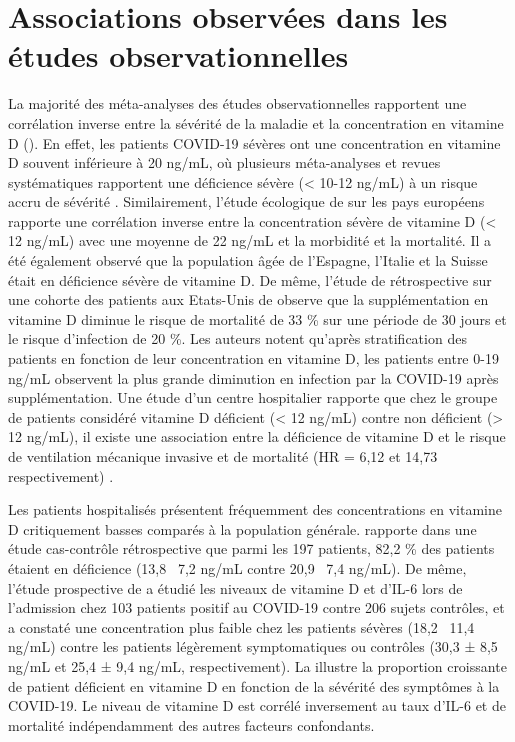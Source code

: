 \documentclass[
  a4paper,
  DIV=11,
  numbers=noendperiod,
  listof=totoc]{scrreprt}
\begin{document}
\section{Associations observées dans les études
observationnelles}\label{associations-observuxe9es-dans-les-uxe9tudes-observationnelles}

La majorité des méta-analyses des études observationnelles rapportent
une corrélation inverse entre la sévérité de la maladie et la
concentration en vitamine D (). En effet,
les patients COVID-19 sévères ont une concentration en vitamine D
souvent inférieure à 20 ng/mL, où plusieurs méta-analyses et revues
systématiques rapportent une déficience sévère (\textless{} 10-12 ng/mL)
à un risque accru de sévérité
\autocite{Contreras-Bolívar.2023, Borsche.2021,
Crafa.2021, DEcclesiis.2022, Pal.2022, Hariyanto.2022, Ghelani.2021}.
Similairement, l'étude écologique de \textcite{Ilie.2020} sur les pays
européens rapporte une corrélation inverse entre la concentration sévère
de vitamine D (\textless{} 12 ng/mL) avec une moyenne de 22 ng/mL et la
morbidité et la mortalité. Il a été également observé que la population
âgée de l'Espagne, l'Italie et la Suisse était en déficience sévère de
vitamine D. De même, l'étude de rétrospective sur une cohorte des
patients aux Etats-Unis de \textcite{Gibbons.2022} observe que la
supplémentation en vitamine D diminue le risque de mortalité de 33 \%
sur une période de 30 jours et le risque d'infection de 20 \%. Les
auteurs notent qu'après stratification des patients en fonction de leur
concentration en vitamine D, les patients entre 0-19 ng/mL observent la
plus grande diminution en infection par la COVID-19 après
supplémentation. Une étude d'un centre hospitalier rapporte que chez le
groupe de patients considéré vitamine D déficient (\textless{} 12 ng/mL)
contre non déficient (\textgreater{} 12 ng/mL), il existe une
association entre la déficience de vitamine D et le risque de
ventilation mécanique invasive et de mortalité (\ac{HR} = 6,12 et 14,73
respectivement) \autocite{Radujkovic.2020}.

Les patients hospitalisés présentent fréquemment des concentrations en
vitamine D critiquement basses comparés à la population générale.
\textcite{Hernández.2020} rapporte dans une étude cas-contrôle
rétrospective que parmi les 197 patients, 82,2 \% des patients étaient
en déficience (13,8 \pm ~7,2 ng/mL contre 20,9 \pm ~7,4 ng/mL). De même,
l'étude prospective de \textcite{Campi.2021} a étudié les niveaux de
vitamine D et d'IL-6 lors de l'admission chez 103 patients positif au
COVID-19 contre 206 sujets contrôles, et a constaté une concentration
plus faible chez les patients sévères (18,2 \pm ~11,4 ng/mL) contre les
patients légèrement symptomatiques ou contrôles (30,3 ± 8,5 ng/mL et
25,4 ± 9,4 ng/mL, respectivement). La 
illustre la proportion croissante de patient déficient en vitamine D en
fonction de la sévérité des symptômes à la COVID-19. Le niveau de
vitamine D est corrélé inversement au taux d'IL-6 et de mortalité
indépendamment des autres facteurs confondants.
\end{document}
